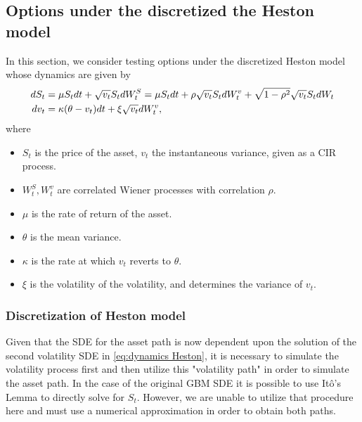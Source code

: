 \subsection{Options under the discretized the Heston model}
In this section, we consider  testing options under the discretized Heston model \cite{heston1993closed,broadie2006exact,kahl2006fast,andersen2007efficient} whose dynamics are given by
\begin{align}\label{eq:dynamics Heston}
dS_t&=\mu S_t dt+\sqrt{v_t}S_t dW_t^S= \mu S_t dt+ \rho\sqrt{v_t}S_t dW_t^v+ \sqrt{1-\rho^2} \sqrt{v_t}S_t dW_t \nonumber\\
dv_t&=\kappa (\theta-v_t)dt+\xi \sqrt{v_t} dW_t^v,
\end{align}
where 

\begin{itemize}
\item $S_t$ is the price of the asset, $v_t$ the instantaneous variance, given as  a CIR process.
\item $W_{t}^{S},W_{t}^{v}$ are correlated Wiener processes with correlation $\rho$.
\item $\mu$  is the rate of return of the asset.
\item $\theta$ is  the mean  variance.
\item $\kappa$ is the rate at which $v_t$ reverts to $\theta$.
\item $\xi$ is the volatility of the volatility, and determines the variance of $v_t$.
\end{itemize}

\subsubsection{Discretization of Heston model}
Given that the SDE for the asset path is now dependent  upon the solution of the second volatility SDE in \eqref{eq:dynamics Heston}, it is necessary to simulate the volatility process first and then utilize this "volatility path" in order to simulate the asset path. In the case of the original GBM SDE it is possible to use It\^o's Lemma to directly solve for $S_t$. However, we are unable to utilize that procedure here and must use a numerical approximation in order to obtain both paths. 

